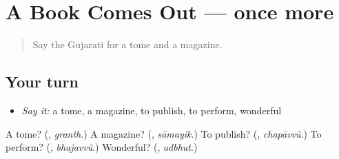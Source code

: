 \section[(dialogue)]{A Book Comes Out — once more}

\label{lesson:GU-R338-review-final-338}



\begin{quote}
Say the Gujarati for a tome and a magazine.
\end{quote}

\subsection*{Your turn}
\begin{itemize}
\raggedright
  \item \emph{Say it:} a tome, a magazine, to publish, to perform, wonderful
\end{itemize}

\begin{tcolorbox}[breakable,colback=teal!4,colframe=teal!35!black,title={Before you move on}]
A tome? (\textbf{}, \emph{granth}.) A magazine? (\textbf{}, \emph{sāmayik}.) To publish? (\textbf{}, \emph{chapāvvũ}.) To perform? (\textbf{}, \emph{bhajavvũ}.) Wonderful? (\textbf{}, \emph{adbhut}.)
\end{tcolorbox}
